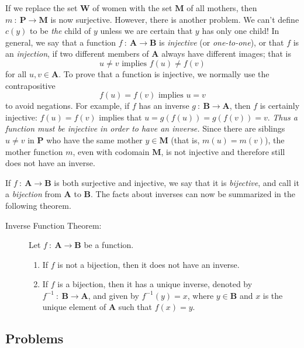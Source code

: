 \documentclass{article}
\newcommand\A{\mathbf A}
\newcommand\B{\mathbf B}
\newcommand\M{\mathbf M}
\newcommand\Pb{\mathbf P}
\newcommand\W{\mathbf W}
\newcommand{\0}{\mathbf 0}
\newcommand{\1}{\mathbf 1}
\begin{document}
If we replace the set $\W$ of women with the set $\M$ of all mothers, then $m\ :\ \Pb \to \M$ is now surjective. However, there is another problem. We can't define $c(y)$ to be \emph{the} child of $y$ unless we are certain that $y$ has only one child! In general, we say that a function $f\ :\ \A \to \B$ is \emph{injective} (or \emph{one-to-one}), or that $f$ is an \emph{injection}, if two different members of $\A$ always have different images; that is
\begin{equation*}
u \neq v \text{ implies } f(u) \neq f(v)
\end{equation*}
for all $u,v \in \A$. To prove that a function is injective, we normally use the contrapositive
\begin{equation*}
f(u) = f(v) \text{ implies } u = v
\end{equation*}
to avoid negations. For example, if $f$ has an inverse $g\ :\ \B \to \A$, then $f$ is certainly injective: $f(u) = f(v)$ implies that $u = g(f(u)) = g(f(v)) = v$. \emph{Thus a function must be injective in order to have an inverse.} Since there are siblings $u \neq v$ in $\Pb$ who have the same mother $y \in \M$ (that is, $m(u) = m(v)$), the mother function $m$, even with codomain $\M$, is not injective and therefore still does not have an inverse.

If $f\ :\ \A \to \B$ is both surjective and injective, we say that it is \emph{bijective}, and call it a \emph{bijection} from $\A$ to $\B$. The facts about inverses can now be summarized in the following theorem.

\begin{description}
  \item[Inverse Function Theorem:] Let $f\ :\ \A \to \B$ be a function.
    \begin{enumerate}[\hspace{1cm}(i)]
      \item If $f$ is not a bijection, then it does not have an inverse.
      \item If $f$ is a bijection, then it has a unique inverse, denoted by $f^{-1}\ :\ \B \to \A$, and given by $f^{-1}(y) = x$, where $y \in \B$ and $x$ is the unique element of $\A$ such that $f(x) = y$.
    \end{enumerate}
\end{description}


\subsection*{Problems}
\end{document}
